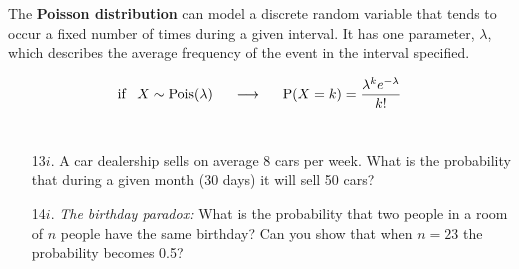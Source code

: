 \documentclass[10pt]{extarticle}
\renewcommand{\P}{\text{P}}
\begin{document}
\hfill

The {\bf Poisson distribution} can model a discrete random variable that tends to occur a fixed number of times during a given interval. It has one parameter, $\lambda$, which describes the average frequency of the event in the interval specified. 

$$\text{if} \;\;\; X \sim \text{Pois}(\lambda) \hspace{0.5cm} \longrightarrow \hspace{0.5cm} \P(X = k) = \frac{\lambda^k e^{-\lambda}}{k!}$$ \ 

\begin{itemize}

	\item[13$i$.] A car dealership sells on average 8 cars per week. What is the probability that during a given month (30 days) it will sell 50 cars? \\  

	\item[14$i$.] {\it The birthday paradox:} What is the probability that two people in a room of $n$ people have the same birthday? Can you show that when $n = 23$ the probability becomes 0.5? \\ 

\end{itemize}
\end{document}
